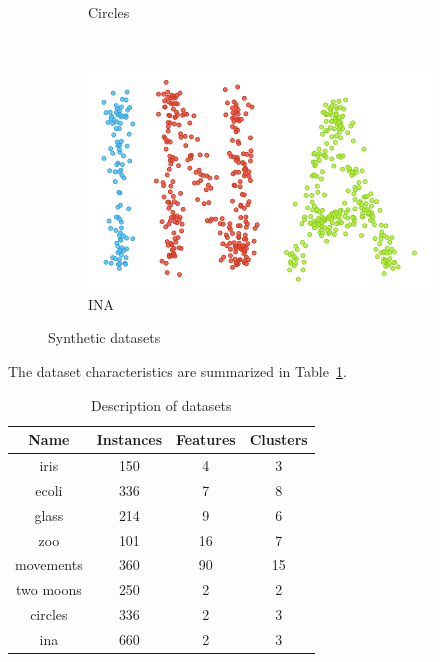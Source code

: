 \documentclass[conference]{IEEEtran}
\begin{document}
\begin{figure}[H]
\begin{subfigure}[c]{0.3\columnwidth}
        \caption{Circles}
        \label{fig:synthetic_circles}
    \end{subfigure}
    ~
    \begin{subfigure}[c]{0.3\columnwidth}
        \includegraphics[width=\columnwidth]{images/ina.png}
        \caption{INA}
        \label{fig:synthetic_ina}
    \end{subfigure}
    \caption{Synthetic datasets}\label{fig:synthetic_datasets}
\end{figure}

The dataset characteristics are summarized in Table~\ref{tab:datasets}.

\begin{table}[ht]
    \centering
    \begin{tabular}{c c c c}
        Name & Instances & Features & Clusters\\ \hline
        iris & 150 & 4 & 3 \\
        ecoli & 336 & 7 & 8 \\
        glass & 214 & 9 & 6 \\
        zoo & 101 & 16 & 7 \\
        movements & 360 & 90 & 15 \\ \hline
        two moons & 250 & 2 & 2 \\
        circles & 336 & 2 & 3 \\
        ina & 660 & 2 & 3 \\
    \end{tabular}
    \caption{Description of datasets}
    \label{tab:datasets}
\end{table}
\end{document}
